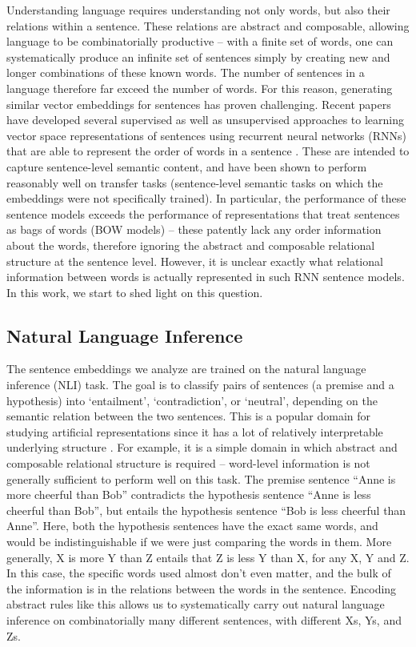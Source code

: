 Understanding language requires understanding not only words, but also their relations within a sentence. These relations are abstract and composable, allowing language to be combinatorially productive -- with a finite set of words, one can systematically produce an infinite set of sentences simply by creating new and longer combinations of these known words. The number of sentences in a language therefore far exceed the number of words. For this reason, generating similar vector embeddings for sentences has proven challenging. Recent papers have developed several supervised as well as unsupervised approaches to learning vector space representations of sentences using recurrent neural networks (RNNs) that are able to represent the order of words in a sentence \citep{kiros2015skip, hill2016learning, Conneau:2017uf}. These are intended to capture sentence-level semantic content, and have been shown to perform reasonably well on transfer tasks (sentence-level semantic tasks on which the embeddings were not specifically trained). In particular, the performance of these sentence models exceeds the performance of representations that treat sentences as bags of words (BOW models) -- these patently lack any order information about the words, therefore ignoring the abstract and composable relational structure at the sentence level. However, it is unclear exactly what relational information between words is actually represented in such RNN sentence models. In this work, we start to shed light on this question.

\subsection{Natural Language Inference}
The sentence embeddings we analyze are trained on the natural language inference (NLI) task. The goal is to classify pairs of sentences (a premise and a hypothesis) into `entailment', `contradiction', or `neutral', depending on the semantic relation between the two sentences. This is a popular domain for studying artificial representations since it has a lot of relatively interpretable underlying structure \citep{glockner2018breaking, mccoy2019right, nie2019analyzing}. For example, it is a simple domain in which abstract and composable relational structure is required -- word-level information is not generally sufficient to perform well on this task. The premise sentence ``Anne is more cheerful than Bob'' contradicts the hypothesis sentence ``Anne is less cheerful than Bob'', but entails the hypothesis sentence ``Bob is less cheerful than Anne''. Here, both the hypothesis sentences have the exact same words, and would be indistinguishable if we were just comparing the words in them. More generally, X is more Y than Z entails that Z is less Y than X, for any X, Y and Z. In this case, the specific words used almost don't even matter, and the bulk of the information is in the relations between the words in the sentence. Encoding abstract rules like this allows us to systematically carry out natural language inference on combinatorially many different sentences, with different Xs, Ys, and Zs.

